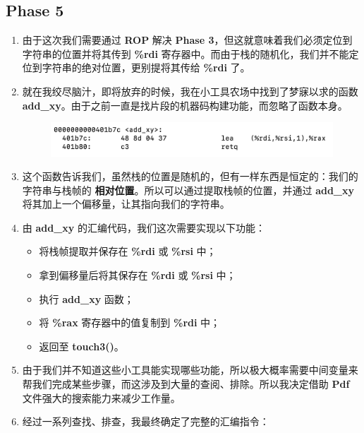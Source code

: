     \subsection{Phase 5}
        \begin{enumerate}
            \item 由于这次我们需要通过 \textbf{ROP} 解决 \textbf{Phase 3}，但这就意味着我们必须定位到字符串的位置并将其传到 \textbf{\%rdi} 寄存器中。而由于栈的随机化，我们并不能定位到字符串的绝对位置，更别提将其传给 \textbf{\%rdi} 了。
            \item 就在我绞尽脑汁，即将放弃的时候，我在小工具农场中找到了梦寐以求的函数 \textbf{add\_xy}。由于之前一直是找片段的机器码构建功能，而忽略了函数本身。
                \begin{figure}[htbp]
                    \hspace*{1.5cm}
                    \includegraphics*[width = 12cm]{s5_0.png}
                \end{figure}
            \item 这个函数告诉我们，虽然栈的位置是随机的，但有一样东西是恒定的：我们的字符串与栈帧的 \textbf{相对位置}。所以可以通过提取栈帧的位置，并通过 \textbf{add\_xy} 将其加上一个偏移量，让其指向我们的字符串。
            \item 由 \textbf{add\_xy} 的汇编代码，我们这次需要实现以下功能：
            \begin{itemize}
                \item 将栈帧提取并保存在 \textbf{\%rdi} 或 \textbf{\%rsi} 中；
                \item 拿到偏移量后将其保存在 \textbf{\%rdi} 或 \textbf{\%rsi} 中；
                \item 执行 \textbf{add\_xy} 函数；
                \item 将 \textbf{\%rax} 寄存器中的值复制到 \textbf{\%rdi} 中；
                \item 返回至 \textbf{touch3()}。
            \end{itemize}
            \item 由于我们并不知道这些小工具能实现哪些功能，所以极大概率需要中间变量来帮我们完成某些步骤，而这涉及到大量的查阅、排除。所以我决定借助 \textbf{Pdf} 文件强大的搜索能力来减少工作量。
            \item 经过一系列查找、排查，我最终确定了完整的汇编指令：

\end{enumerate}
